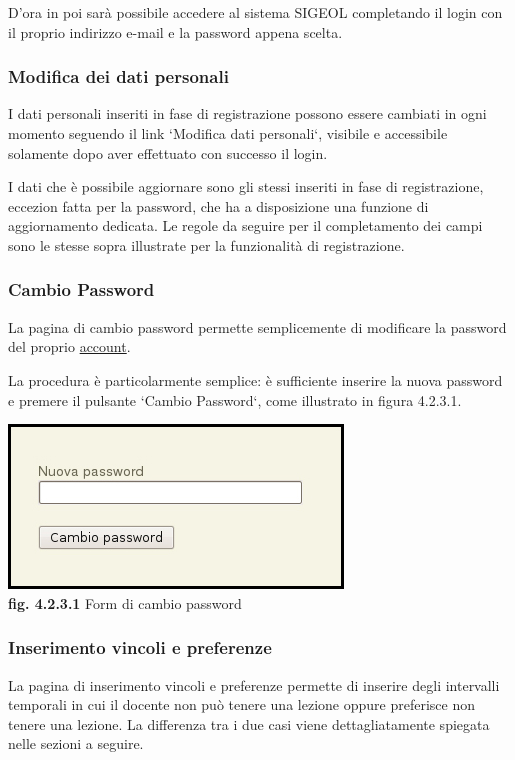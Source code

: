 \documentclass[11pt,a4paper]{article}
\begin{document}
D'ora in poi sarà possibile accedere al sistema SIGEOL completando il login con il proprio indirizzo e-mail e la password appena scelta.
\subsubsection{Modifica dei dati personali}
I dati personali inseriti in fase di registrazione possono essere cambiati in ogni momento seguendo il link `Modifica dati personali`, visibile e accessibile solamente dopo aver effettuato con successo il login.

I dati che è possibile aggiornare sono gli stessi inseriti in fase di registrazione, eccezion fatta per la password, che ha a disposizione una funzione di aggiornamento dedicata. Le regole da seguire per il completamento dei campi sono le stesse sopra illustrate per la funzionalità di registrazione.
\subsubsection{Cambio Password}
La pagina di cambio password permette semplicemente di modificare la password del proprio \underline{account}.

La procedura è particolarmente semplice: è sufficiente inserire la nuova password e premere il pulsante `Cambio Password`, come illustrato in figura 4.2.3.1.

\begin{center}
	\includegraphics[scale=0.5]{images/cambio_password.jpg}\\
	\textbf{fig. 4.2.3.1} Form di cambio password\\
\end{center}

\subsubsection{Inserimento vincoli e preferenze}
La pagina di inserimento vincoli e preferenze permette di inserire degli intervalli temporali in cui il docente non può tenere una lezione oppure preferisce non tenere una lezione. La differenza tra i due casi viene dettagliatamente spiegata nelle sezioni a seguire.
\end{document}
